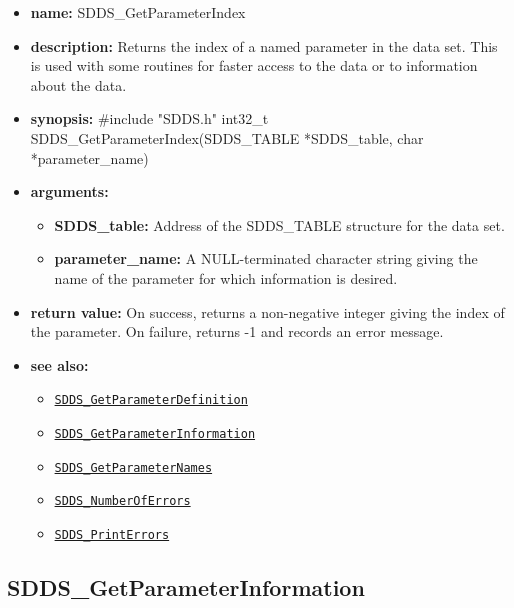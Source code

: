 \documentclass[11pt]{article}
\newcommand{\progref}[1]{\hyperref[SDDS_#1]{\tt SDDS\_#1}}
\begin{document}
\begin{itemize}
\item {\bf name:}\newline
SDDS\_GetParameterIndex
\item {\bf description:}\newline
Returns the index of a named parameter in the data set. This is used with some routines for faster access to the data or to information about the data.
\item {\bf synopsis:} \#include "SDDS.h"\newline
int32\_t SDDS\_GetParameterIndex(SDDS\_TABLE *SDDS\_table, char *parameter\_name)
\item {\bf arguments:}
\begin{itemize}
\item {\bf SDDS\_table:} Address of the SDDS\_TABLE structure for the data set.
\item {\bf parameter\_name:} A NULL-terminated character string giving the name of the parameter for which information is desired.
\end{itemize}
\item {\bf return value:}\newline
On success, returns a non-negative integer giving the index of the parameter. On failure, returns -1 and records an error message.
\item {\bf see also:}
\begin{itemize}
\item \progref{GetParameterDefinition}
\item \progref{GetParameterInformation}
\item \progref{GetParameterNames}
\item \progref{NumberOfErrors}
\item \progref{PrintErrors}
\end{itemize}
\end{itemize}

\subsection{SDDS\_GetParameterInformation}
\label{SDDS_GetParameterInformation}
\end{document}
